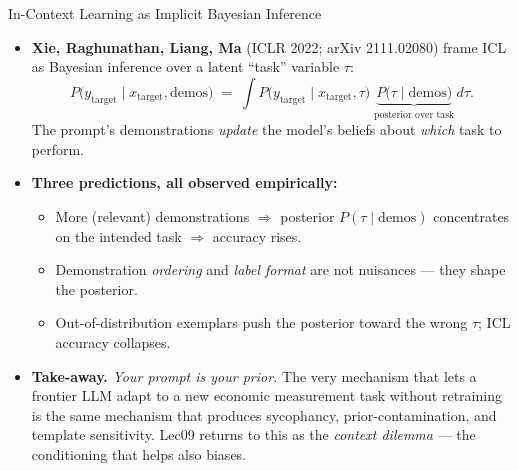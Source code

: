 \begin{frame}{In-Context Learning as Implicit Bayesian Inference}
\begin{itemize}
\item \textbf{Xie, Raghunathan, Liang, Ma} (ICLR 2022; arXiv 2111.02080) frame ICL as Bayesian inference over a latent ``task'' variable $\tau$:
\[
   P\bigl(y_{\text{target}} \mid x_{\text{target}}, \text{demos}\bigr) \;=\; \int P\bigl(y_{\text{target}} \mid x_{\text{target}}, \tau\bigr)\;\underbrace{P\bigl(\tau \mid \text{demos}\bigr)}_{\text{posterior over task}}\,d\tau.
\]
The prompt's demonstrations \emph{update} the model's beliefs about \emph{which} task to perform.

\medskip
\item \textbf{Three predictions, all observed empirically:}
\begin{itemize}
    \item More (relevant) demonstrations $\Rightarrow$ posterior $P(\tau \mid \text{demos})$ concentrates on the intended task $\Rightarrow$ accuracy rises.
    \item Demonstration \emph{ordering} and \emph{label format} are not nuisances --- they shape the posterior.
    \item Out-of-distribution exemplars push the posterior toward the wrong $\tau$; ICL accuracy collapses.
\end{itemize}

\medskip
\item \textbf{Take-away.} \emph{Your prompt is your prior.} The very mechanism that lets a frontier LLM adapt to a new economic measurement task without retraining is the same mechanism that produces sycophancy, prior-contamination, and template sensitivity. Lec09 returns to this as the \emph{context dilemma} --- the conditioning that helps also biases.
\end{itemize}
\end{frame}

